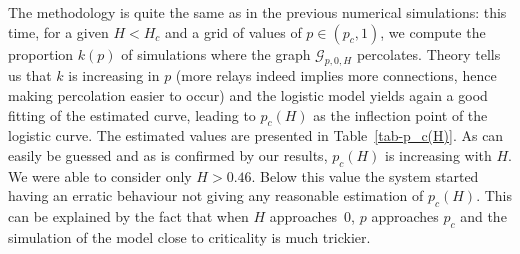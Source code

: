 \documentclass[conference]{IEEEtran}
\begin{document}
The methodology is quite the same as in the previous numerical simulations: this time, for a given $H<H_c$ and a grid of values of $p \in (p_c,1)$, we compute the proportion $k(p)$ of simulations where the graph $\mathcal{G}_{p,0,H}$ percolates. Theory tells us that $k$ is increasing in $p$ (more relays indeed implies more connections, hence making percolation easier to occur) and the logistic model yields again a good fitting of the estimated curve, leading to $p_c(H)$ as the inflection point of the logistic curve. The estimated values are presented in Table~\ref{tab-p_c(H)}. As can easily be guessed and as is confirmed by our results, $p_c(H)$ is increasing with $H$.
We were able to consider only  $H>0.46$. Below this value 
the system started having an erratic behaviour not giving any  
reasonable estimation of $p_{c}(H)$. This can be explained by the  fact
that when $H$ approaches~0, $p$ approaches $p_{c}$ and the simulation of the model close to criticality is much trickier.
\end{document}
